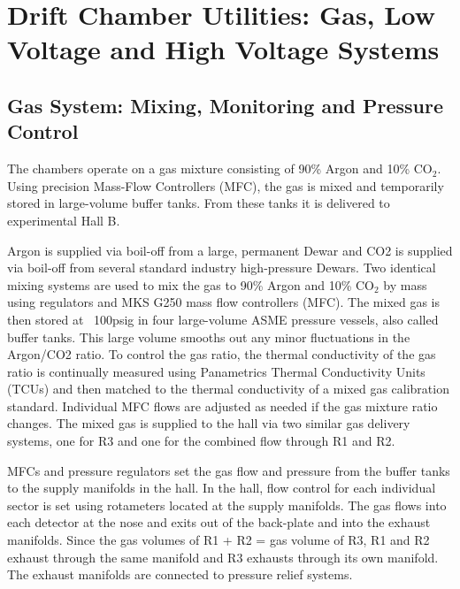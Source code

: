 \section{Drift Chamber Utilities: Gas, Low Voltage and High Voltage Systems}

\subsection{Gas System: Mixing, Monitoring and Pressure Control}

The chambers operate on a gas mixture consisting of 90\% Argon and 10\% CO$_2$.
Using precision Mass-Flow Controllers (MFC), the gas is mixed and temporarily
stored in large-volume buffer tanks.  From these tanks it is delivered
to experimental Hall B.  

Argon is supplied via boil-off from a large, permanent Dewar and CO2 is supplied 
via boil-off from several standard industry high-pressure Dewars.  Two identical mixing
systems are used to mix the gas to 90\% Argon and 10\% CO$_2$ by mass using regulators and MKS G250 
mass flow controllers (MFC).  The mixed gas is then stored at ~100psig in four large-volume 
ASME pressure vessels, also called buffer tanks. This large volume smooths out 
any minor fluctuations in the Argon/CO2 ratio. To control the gas ratio, the thermal 
conductivity of the gas ratio is continually measured using Panametrics Thermal 
Conductivity Units (TCUs) and then matched to the thermal conductivity of a mixed 
gas calibration standard. Individual MFC flows are adjusted as needed if the gas mixture
ratio changes. The mixed gas is supplied to the hall via two similar gas delivery systems, 
one for R3 and one for the combined flow through R1 and R2. 

MFCs and pressure regulators set the gas flow and pressure from the 
buffer tanks to the supply manifolds in the hall. In the hall, flow control for each 
individual sector is set using rotameters located at the supply manifolds. The gas flows 
into each detector at the nose and exits out of the back-plate and into the exhaust 
manifolds. Since the gas volumes of R1 + R2 = gas volume of R3, R1 and R2 exhaust 
through the same manifold and R3 exhausts through its own manifold. The exhaust manifolds 
are connected to pressure relief systems. 

